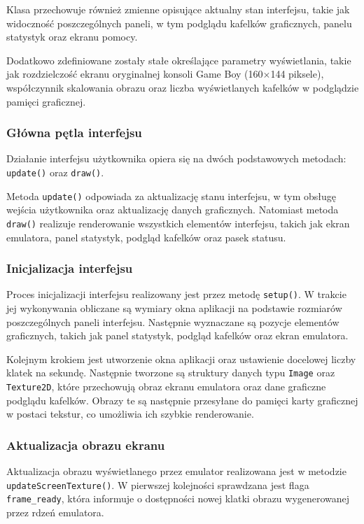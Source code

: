 \documentclass{article}
\begin{document}
Klasa przechowuje również zmienne opisujące aktualny stan interfejsu, takie jak 
widoczność poszczególnych paneli, w tym podglądu kafelków graficznych, panelu 
statystyk oraz ekranu pomocy.

Dodatkowo zdefiniowane zostały stałe określające parametry wyświetlania, takie jak 
rozdzielczość ekranu oryginalnej konsoli Game Boy (160$\times$144 piksele), 
współczynnik skalowania obrazu oraz liczba wyświetlanych kafelków w podglądzie pamięci 
graficznej.
\subsubsection{Główna pętla interfejsu}

Działanie interfejsu użytkownika opiera się na dwóch podstawowych metodach: 
\texttt{update()} oraz \texttt{draw()}.

Metoda \texttt{update()} odpowiada za aktualizację stanu interfejsu, w tym 
obsługę wejścia użytkownika oraz aktualizację danych graficznych. 
Natomiast metoda \texttt{draw()} realizuje renderowanie wszystkich elementów 
interfejsu, takich jak ekran emulatora, panel statystyk, podgląd kafelków 
oraz pasek statusu.
\subsubsection{Inicjalizacja interfejsu}

Proces inicjalizacji interfejsu realizowany jest przez metodę \texttt{setup()}. 
W trakcie jej wykonywania obliczane są wymiary okna aplikacji na podstawie 
rozmiarów poszczególnych paneli interfejsu. Następnie wyznaczane są pozycje 
elementów graficznych, takich jak panel statystyk, podgląd kafelków oraz ekran 
emulatora.

Kolejnym krokiem jest utworzenie okna aplikacji oraz ustawienie docelowej liczby 
klatek na sekundę. Następnie tworzone są struktury danych typu \texttt{Image} 
oraz \texttt{Texture2D}, które przechowują obraz ekranu emulatora oraz dane 
graficzne podglądu kafelków. Obrazy te są następnie przesyłane do pamięci karty 
graficznej w postaci tekstur, co umożliwia ich szybkie renderowanie.

\subsubsection{Aktualizacja obrazu ekranu}

Aktualizacja obrazu wyświetlanego przez emulator realizowana jest w metodzie 
\texttt{updateScreenTexture()}. W pierwszej kolejności sprawdzana jest flaga 
\texttt{frame\_ready}, która informuje o dostępności nowej klatki obrazu 
wygenerowanej przez rdzeń emulatora.
\end{document}
